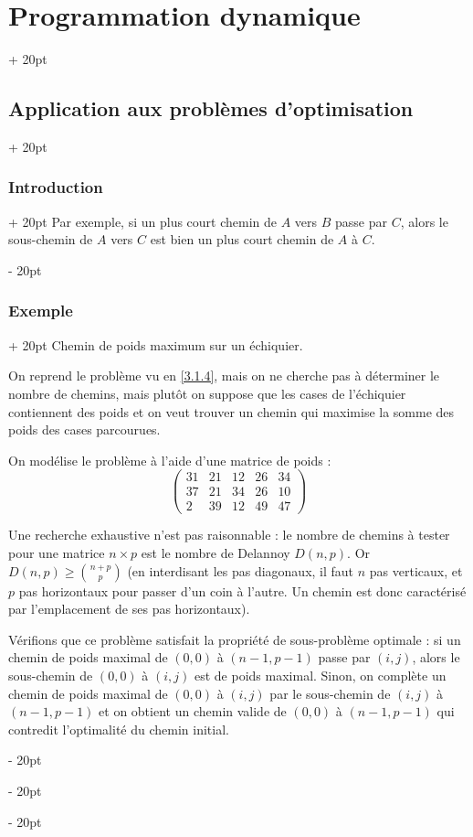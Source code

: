 \documentclass[a4paper, 12pt, twoside]{article}
\renewcommand{\ge}{\geqslant}
\newcommand{\ind}[1][20pt]{\advance\leftskip + #1}
\newcommand{\deind}[1][20pt]{\advance\leftskip - #1}
\newenvironment{indt}[2][20pt]{#2 \par \ind[#1]}{\par \deind} %
\begin{document}
\begin{indt}{\section{Programmation dynamique}}
\begin{indt}{\subsection{Application aux problèmes d'optimisation}}
\begin{indt}{\subsubsection{Introduction}}
                Par exemple, si un plus court chemin de $A$ vers $B$ passe par $C$, alors le sous-chemin de $A$ vers $C$ est bien un plus court chemin de $A$ à $C$.
            \end{indt}
            
            \vspace{12pt}
            
            \begin{indt}{\subsubsection{Exemple}}
                Chemin de poids maximum sur un échiquier.
                
                On reprend le problème vu en \ref{3.1.4}, mais on ne cherche pas à déterminer le nombre de chemins, mais plutôt on suppose que les cases de l'échiquier contiennent des poids et on veut trouver un chemin qui maximise la somme des poids des cases parcourues.
                
                On modélise le problème à l'aide d'une matrice de poids :
                    \[
                        \begin{pmatrix}
                            31 & 21 & 12 & 26 & 34
                            \\
                            37 & 21 & 34 & 26 & 10
                            \\
                            2 & 39 & 12 & 49 & 47
                        \end{pmatrix}
                    \]
                
                Une recherche exhaustive n'est pas raisonnable : le nombre de chemins à tester pour une matrice $n \times p$ est le nombre de Delannoy $D(n, p)$. Or $\displaystyle D(n, p) \ge \binom{n + p}{p}$ (en interdisant les pas diagonaux, il faut $n$ pas verticaux, et $p$ pas horizontaux pour passer d'un coin à l'autre. Un chemin est donc caractérisé par l'emplacement de ses pas horizontaux).
                
                \vspace{12pt}
                
                Vérifions que ce problème satisfait la propriété de sous-problème optimale : si un chemin de poids maximal de $(0, 0)$ à $(n - 1, p - 1)$ passe par $(i, j)$, alors le sous-chemin de $(0, 0)$ à $(i, j)$ est de poids maximal. Sinon, on complète un chemin de poids maximal de $(0, 0)$ à $(i, j)$ par le sous-chemin de $(i, j)$ à $(n - 1, p - 1)$ et on obtient un chemin valide de $(0, 0)$ à $(n - 1, p - 1)$ qui contredit l'optimalité du chemin initial.
                

\end{indt}
\end{indt}
\end{indt}
\end{document}
